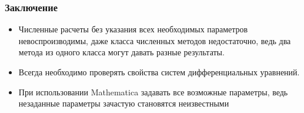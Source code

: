 \documentclass[utf8,9pt,mathserif,usepdftitle=false]{beamer}
\begin{document}
\begin{frame}
  \frametitle{Заключение}%
  \begin{itemize}
  \item<1-> Численные расчеты без указания всех необходимых параметров невоспроизводимы, даже класса численных методов недостаточно, ведь два метода из одного класса могут давать разные результаты.
  \item<2-> Всегда необходимо проверять свойства систем дифференциальных уравнений.
  \item<3-> При использовании Mathematica задавать все возможные параметры, ведь незаданные параметры зачастую становятся неизвестными
  \end{itemize}
\end{frame}
\end{document}
